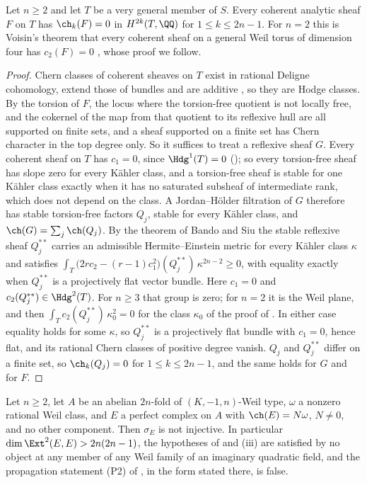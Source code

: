 \begin{proposition}
\label{prop:weiltorussheaves}
Let $n\ge2$ and let $T$ be a very general member of $S$. Every coherent
analytic sheaf $F$ on $T$ has $\ch_{k}(F)=0$ in $H^{2k}(T,\QQ)$ for
$1\le k\le2n-1$. For $n=2$ this is Voisin's theorem that every coherent sheaf
on a general Weil torus of dimension four has $c_{2}(F)=0$
\cite[Theorem~10]{Voi02b}, whose proof we follow.
\end{proposition}

\begin{proof}
Chern classes of coherent sheaves on $T$ exist in rational Deligne
cohomology, extend those of bundles and are additive \cite{Gri10}, so they
are Hodge classes. By  the torsion of $F$, the locus where the
torsion-free quotient is not locally free, and the cokernel of the map from
that quotient to its reflexive hull are all supported on finite sets, and a
sheaf supported on a finite set has Chern character in the top degree only. So
it suffices to treat a reflexive sheaf $G$. Every coherent sheaf on $T$ has
$c_{1}=0$, since $\Hdg^{1}(T)=0$ (); so every
torsion-free sheaf has slope zero for every K\"ahler class, and a torsion-free
sheaf is stable for one K\"ahler class exactly when it has no saturated
subsheaf of intermediate rank, which does not depend on the class. A
Jordan--H\"older filtration of $G$ therefore has stable torsion-free factors
$Q_{j}$, stable for every K\"ahler class, and $\ch(G)=\sum_{j}\ch(Q_{j})$.
By the theorem of Bando and Siu \cite{BS94} the stable reflexive sheaf
$Q_{j}^{**}$ carries an admissible Hermite--Einstein metric for every K\"ahler
class $\kappa$ and satisfies
$\int_{T}\bigl(2rc_{2}-(r-1)c_{1}^{2}\bigr)(Q_{j}^{**})\,\kappa^{2n-2}\ge0$,
with equality exactly when $Q_{j}^{**}$ is a projectively flat vector bundle.
Here $c_{1}=0$ and $c_{2}(Q_{j}^{**})\in\Hdg^{2}(T)$. For $n\ge3$ that group is
zero; for $n=2$ it is the Weil plane, and then
$\int_{T}c_{2}(Q_{j}^{**})\,\kappa_{0}^{2}=0$ for the class $\kappa_{0}$ of
the proof of . In either case equality holds for
some $\kappa$, so $Q_{j}^{**}$ is a projectively flat bundle with $c_{1}=0$,
hence flat, and its rational Chern classes of positive degree vanish.
$Q_{j}$ and $Q_{j}^{**}$ differ on a finite set, so $\ch_{k}(Q_{j})=0$ for
$1\le k\le2n-1$, and the same holds for $G$ and for $F$.
\end{proof}

\begin{theorem}
\label{thm:p2false}
Let $n\ge2$, let $A$ be an abelian $2n$-fold of $(K,-1,n)$-Weil type, $\omega$
a nonzero rational Weil class, and $E$ a perfect complex on $A$ with
$\ch(E)=N\omega$, $N\ne0$, and no other component. Then $\sigma_{E}$ is not
injective. In particular $\dim\Ext^{2}(E,E)>2n(2n-1)$, the hypotheses of
 and (iii) are satisfied by no
object at any member of any Weil family of an imaginary quadratic field, and
the propagation statement \textup{(P2)} of , in the form
stated there, is false.
\end{theorem}

